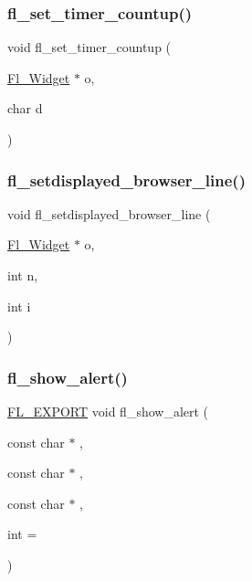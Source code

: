 \mbox{\label{forms_8_h_a1bc04df8da885e579140586b66811e6f}} 
\subsubsection{\texorpdfstring{fl\+\_\+set\+\_\+timer\+\_\+countup()}{fl\_set\_timer\_countup()}}
{\footnotesize\ttfamily void fl\+\_\+set\+\_\+timer\+\_\+countup (\begin{DoxyParamCaption}\item[{\hyperlink{class_fl___widget}{Fl\+\_\+\+Widget} $\ast$}]{o,  }\item[{char}]{d }\end{DoxyParamCaption})\hspace{0.3cm}{\ttfamily [inline]}}

\mbox{\label{forms_8_h_a756b7f3c6d6f4d64e26915b05c4f2057}} 
\subsubsection{\texorpdfstring{fl\+\_\+setdisplayed\+\_\+browser\+\_\+line()}{fl\_setdisplayed\_browser\_line()}}
{\footnotesize\ttfamily void fl\+\_\+setdisplayed\+\_\+browser\+\_\+line (\begin{DoxyParamCaption}\item[{\hyperlink{class_fl___widget}{Fl\+\_\+\+Widget} $\ast$}]{o,  }\item[{int}]{n,  }\item[{int}]{i }\end{DoxyParamCaption})\hspace{0.3cm}{\ttfamily [inline]}}

\mbox{\label{forms_8_h_aba85bc67b4d183421b4e45a2a8a6ac2b}} 
\subsubsection{\texorpdfstring{fl\+\_\+show\+\_\+alert()}{fl\_show\_alert()}}
{\footnotesize\ttfamily \hyperlink{_fl___export_8_h_aa9ba29a18aee9d738370a06eeb4470fc}{F\+L\+\_\+\+E\+X\+P\+O\+RT} void fl\+\_\+show\+\_\+alert (\begin{DoxyParamCaption}\item[{const char $\ast$}]{,  }\item[{const char $\ast$}]{,  }\item[{const char $\ast$}]{,  }\item[{int}]{ = {} }\end{DoxyParamCaption})}

